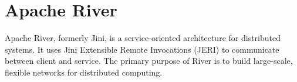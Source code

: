 \section{Apache River}

Apache River, \cite{hid-sp18-www-526-apache-river} formerly
Jini, is a service-oriented architecture for distributed
systems. It uses Jini Extensible Remote Invocations (JERI)
to communicate between client and service. The primary 
purpose of River is to build large-scale, flexible networks
for distributed computing.

